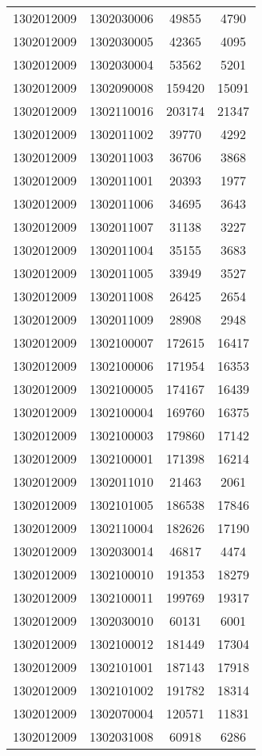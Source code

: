 \begin{longtable}{llcc}
1302012009 & 1302030006 & 49855 & 4790\\
1302012009 & 1302030005 & 42365 & 4095\\
1302012009 & 1302030004 & 53562 & 5201\\
1302012009 & 1302090008 & 159420 & 15091\\
1302012009 & 1302110016 & 203174 & 21347\\
1302012009 & 1302011002 & 39770 & 4292\\
1302012009 & 1302011003 & 36706 & 3868\\
1302012009 & 1302011001 & 20393 & 1977\\
1302012009 & 1302011006 & 34695 & 3643\\
1302012009 & 1302011007 & 31138 & 3227\\
1302012009 & 1302011004 & 35155 & 3683\\
1302012009 & 1302011005 & 33949 & 3527\\
1302012009 & 1302011008 & 26425 & 2654\\
1302012009 & 1302011009 & 28908 & 2948\\
1302012009 & 1302100007 & 172615 & 16417\\
1302012009 & 1302100006 & 171954 & 16353\\
1302012009 & 1302100005 & 174167 & 16439\\
1302012009 & 1302100004 & 169760 & 16375\\
1302012009 & 1302100003 & 179860 & 17142\\
1302012009 & 1302100001 & 171398 & 16214\\
1302012009 & 1302011010 & 21463 & 2061\\
1302012009 & 1302101005 & 186538 & 17846\\
1302012009 & 1302110004 & 182626 & 17190\\
1302012009 & 1302030014 & 46817 & 4474\\
1302012009 & 1302100010 & 191353 & 18279\\
1302012009 & 1302100011 & 199769 & 19317\\
1302012009 & 1302030010 & 60131 & 6001\\
1302012009 & 1302100012 & 181449 & 17304\\
1302012009 & 1302101001 & 187143 & 17918\\
1302012009 & 1302101002 & 191782 & 18314\\
1302012009 & 1302070004 & 120571 & 11831\\
1302012009 & 1302031008 & 60918 & 6286\\

\end{longtable}
